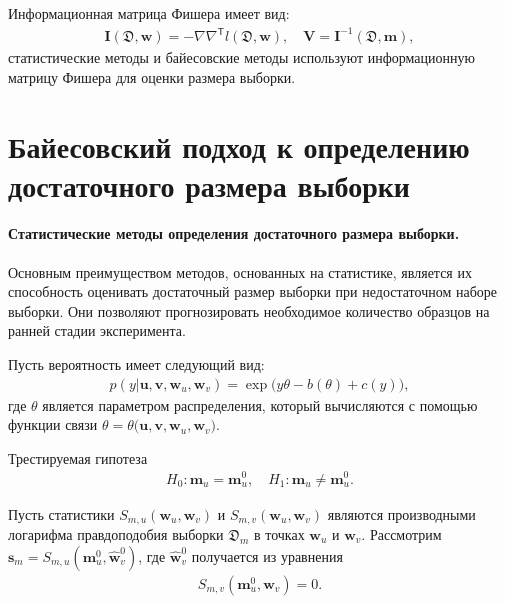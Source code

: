 Информационная матрица Фишера имеет вид:
\[
\label{eq:ps:6}
\begin{aligned}
	\textbf{I}\left(\mathfrak{D}, \textbf{w}\right) = -\nabla\nabla^{\mathsf{T}}l\left(\mathfrak{D}, \textbf{w}\right), \quad  \textbf{V} = \textbf{I}^{-1}\left(\mathfrak{D}, \textbf{m}\right),
\end{aligned}
\]
статистические методы и байесовские методы используют информационную матрицу Фишера для оценки размера выборки.

\section{Байесовский подход к определению достаточного размера выборки}

\paragraph{Статистические методы определения достаточного размера выборки.}
Основным преимуществом методов, основанных на статистике, является их способность оценивать достаточный размер выборки при недостаточном наборе выборки. Они позволяют прогнозировать необходимое количество образцов на ранней стадии эксперимента.

Пусть вероятность имеет следующий вид:
\[
\label{eq:sb:1}
\begin{aligned}
	p(y|\textbf{u},\textbf{v},\textbf{w}_{u},\textbf{w}_{v}) = \exp\bigl(y\theta- b(\theta) + c\left(y\right)\bigr),
\end{aligned}
\]
где $\theta$ является параметром распределения, который вычисляются с помощью функции связи $\theta=\theta\bigr(\textbf{u},\textbf{v},\textbf{w}_{u},\textbf{w}_{v}\bigr)$.

Трестируемая гипотеза
\[
\label{eq:sb:2}
\begin{aligned}
	H_0: \textbf{m}_{u} = \textbf{m}^0_{u}, \quad H_1: \textbf{m}_{u} \not= \textbf{m}^0_{u}.
\end{aligned}
\]

Пусть статистики $S_{m,u}\left(\textbf{w}_{u}, \textbf{w}_{v}\right)$ и $S_{m,v}\left(\textbf{w}_{u}, \textbf{w}_{v}\right)$ являются производными логарифма правдоподобия выборки $\mathfrak{D}_{m}$ в точках $\textbf{w}_{u}$ и $\textbf{w}_{v}$.
Рассмотрим $\textbf{s}_{m} = S_{m,u}\left(\textbf{m}^{0}_{u}, \hat{\textbf{w}}^{0}_{v}\right)$, где $\hat{\textbf{w}}^{0}_{v}$ получается из уравнения
\[
\label{eq:sb:3}
\begin{aligned}
	S_{m,v}\left(\textbf{m}^{0}_{u}, \textbf{w}_{v}\right) = 0.
\end{aligned}
\]

